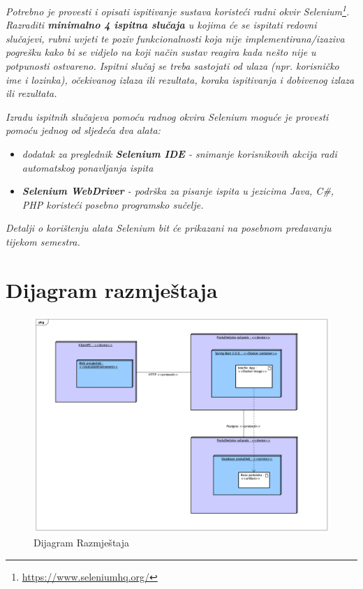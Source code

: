 			 \textit{Potrebno je provesti i opisati ispitivanje sustava koristeći radni okvir Selenium\footnote{\url{https://www.seleniumhq.org/}}. Razraditi \textbf{minimalno 4 ispitna slučaja} u kojima će se ispitati redovni slučajevi, rubni uvjeti te poziv funkcionalnosti koja nije implementirana/izaziva pogrešku kako bi se vidjelo na koji način sustav reagira kada nešto nije u potpunosti ostvareno. Ispitni slučaj se treba sastojati od ulaza (npr. korisničko ime i lozinka), očekivanog izlaza ili rezultata, koraka ispitivanja i dobivenog izlaza ili rezultata.\\ }
			 
			 \textit{Izradu ispitnih slučajeva pomoću radnog okvira Selenium moguće je provesti pomoću jednog od sljedeća dva alata:}
			 \begin{itemize}
			 	\item \textit{dodatak za preglednik \textbf{Selenium IDE} - snimanje korisnikovih akcija radi automatskog ponavljanja ispita	}
			 	\item \textit{\textbf{Selenium WebDriver} - podrška za pisanje ispita u jezicima Java, C\#, PHP koristeći posebno programsko sučelje.}
			 \end{itemize}
		 	\textit{Detalji o korištenju alata Selenium bit će prikazani na posebnom predavanju tijekom semestra.}
			
			\eject 
		
		
		\section{Dijagram razmještaja}
			
\begin{figure}[H]
	\includegraphics[scale=0.3]{slike/dijagram_razmjestaja.jpeg}
	\centering
	\caption{Dijagram Razmještaja}
	\label{fig:dijagram_razmjestaja}
\end{figure}

